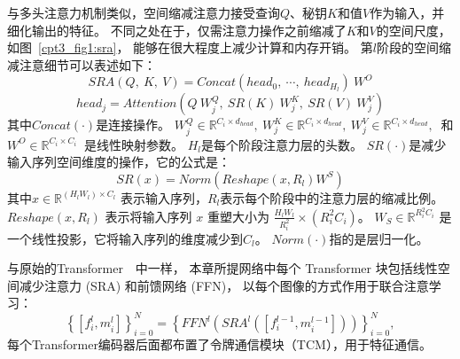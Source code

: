 与多头注意力机制类似，空间缩减注意力接受查询$Q$、秘钥$K$和值$V$作为输入，并细化输出的特征。
不同之处在于，仅需注意力操作之前缩减了$K$和$V$的空间尺度，如图~\ref{cpt3_fig1:sra}，
能够在很大程度上减少计算和内存开销。
第$l$阶段的空间缩减注意细节可以表述如下：
%
%
%
%
\begin{equation}
	SRA(Q,~K,~V) = Concat(head_{0},~ \cdots,~ head_{H_{l}})~W^{O}
\end{equation}
%
%
\begin{equation}
	head_{j} = Attention(Q~W_{j}^{Q}, ~ SR(K)~W_{j}^{K},~ SR(V)~W_{j}^{V})
\end{equation}
%
%
%
其中$Concat(\cdot)$是连接操作。
$W_{j}^{Q} \in \mathbb{R}^{C_{i} \times d_{head}},~
W_{j}^{K} \in \mathbb{R}^{C_{i} \times d_{head}},~
W_{j}^{V} \in \mathbb{R}^{C_{i} \times d_{head}},~$
和
$W^{O} \in \mathbb{R}^{C_{i} \times C_{i}}~$
是线性映射参数。
$H_{l}$是每个阶段注意力层的头数。
$SR(\cdot)$是减少输入序列空间维度的操作，它的公式是：
%
%
%
\begin{equation}
	SR(x) = Norm(Reshape(x, R_{l})W^{S})
\end{equation}
%
%
其中$x \in \mathbb{R}^{(H_{l}W_{l}) \times C_{l}} $
表示输入序列，$R_{l}$表示每个阶段中的注意力层的缩减比例。
$Reshape(x, R_{l})$ 表示将输入序列 $x$ 重塑大小为
$\frac{H_{l}W_{l}}{R_{i}^{2}} \times (R_{i}^{2}C_{i})$。
$W_{S} \in \mathbb{R}^{R_{i}^{2}C_{i}}$
是一个线性投影，它将输入序列的维度减少到$C_{l}$。
$Norm(\cdot)$指的是层归一化。
%
%
\par
%
%
与原始的Transformer~\cite{vaswani2017attention}~中一样，
本章所提网络中每个 Transformer 块包括线性空间减少注意力 (SRA) 和前馈网络 (FFN)，
以每个图像的方式作用于联合注意学习：
\begin{equation}
	\left \{ [f_{i}^{l}, m_{i}^{l}]\right \}_{i=0}^{N} = \left \{ FFN^{l} \left  ( SRA^{l} \left ( [f_{i}^{l-1}, m_{i}^{l-1}]\right )\right )\right \}_{i=0}^{N},
\end{equation}
每个Transformer编码器后面都布置了令牌通信模块（TCM），用于特征通信。 













